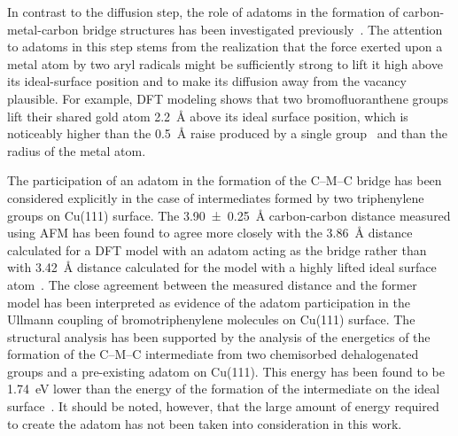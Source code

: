 \documentclass[%
 reprint,
 amsmath,amssymb,
 aps,
prb,
floatfix,
]{revtex4-2}
\newcommand{\lock}{\color{red}}
\newcommand{\lock}{\color{black}}
\newcommand{\comm}{\color{Purple}} %
\begin{document}
{\lock

In contrast to the diffusion step, the role of adatoms in the formation of carbon-metal-carbon bridge structures has been investigated previously~\cite{acsnano2017, acsnano2019}. %
The attention to adatoms in this step stems from the realization that the force exerted upon a metal atom by two aryl radicals might be sufficiently strong to lift it high above its ideal-surface position and to make its diffusion away from the vacancy plausible. 
For example, DFT modeling shows that two bromofluoranthene groups lift their shared gold atom \SI{2.2}{\angstrom} above its ideal surface position, which is noticeably higher than the \SI{0.5}{\angstrom} raise produced by a single group~\cite{jpcc2018} and than the radius of the metal atom.

The participation of an adatom in the formation of the C--M--C bridge has been considered explicitly in the case of intermediates formed by two triphenylene groups on Cu(111) surface. 
The \SI{3.90\pm 0.25}{\angstrom} carbon-carbon distance measured using AFM has been found to agree more closely with the \SI{3.86}{\angstrom} distance calculated for a DFT model with an adatom acting as the bridge rather than with \SI{3.42}{\angstrom} distance calculated for the model with a highly lifted ideal surface atom~\cite{acsnano2017}. 
The close agreement between the measured distance and the former model has been interpreted as evidence of the adatom participation in the Ullmann coupling of bromotriphenylene molecules on Cu(111) surface. 
%
The structural analysis has been supported by the analysis of the energetics of the formation of the C--M--C intermediate from two chemisorbed dehalogenated groups and a pre-existing adatom on Cu(111). This energy has been found to be \SI{1.74}{\electronvolt} lower than the energy of the formation of the intermediate on the ideal surface~\cite{acsnano2017}. It should be noted, however, that the large amount of energy required to create the adatom has not been taken into consideration in this work.

}
\end{document}

